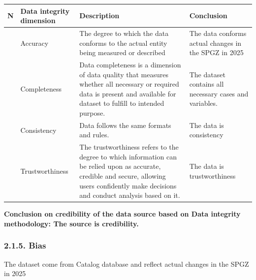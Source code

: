 \documentclass[
]{article}
\begin{document}
\begin{longtable}[]{@{}
  >{\raggedright\arraybackslash}p{}
  >{\raggedright\arraybackslash}p{}
  >{\raggedright\arraybackslash}p{}
  >{\raggedright\arraybackslash}p{}@{}}
\toprule\noalign{}
\begin{minipage}[b]{\linewidth}\raggedright
N
\end{minipage} & \begin{minipage}[b]{\linewidth}\raggedright
Data integrity dimension
\end{minipage} & \begin{minipage}[b]{\linewidth}\raggedright
Description
\end{minipage} & \begin{minipage}[b]{\linewidth}\raggedright
Conclusion
\end{minipage} \\
\midrule\noalign{}
\endhead
\bottomrule\noalign{}
\endlastfoot
1 & Accuracy & The degree to which the data conforms to the actual
entity being measured or described & The data conforms actual changes in
the SPGZ in 2025 \\
2 & Completeness & Data completeness is a dimension of data quality that
measures whether all necessary or required data is present and available
for dataset to fulfill to intended purpose. & The dataset contains all
necessary cases and variables. \\
3 & Consistency & Data follows the same formats and rules. & The data is
consistency \\
4 & Trustworthiness & The trustworthiness refers to the degree to which
information can be relied upon as accurate, credible and secure,
allowing users confidently make decisions and conduct analysis based on
it. & The data is trustworthiness \\
\end{longtable}

\textbf{Conclusion on credibility of the data source based on Data
integrity methodology: The source is credibility.}

\subsubsection{\texorpdfstring{\textbf{2.1.5.
Bias}}{2.1.5. Bias}}\label{bias}

The dataset come from Catalog database and reflect actual changes in the
SPGZ in 2025
\end{document}

